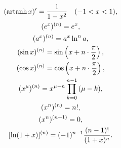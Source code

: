 \begin{gather*}
	(\operatorname{artanh} x)' = \frac{1}{1 - x^2} \quad (-1 < x < 1), \\
	(e^x)^{(n)} = e^x, \\
	(a^x)^{(n)} = a^x \ln^n a, \\
	(\sin x)^{(n)} = \sin \left( x + n \cdot \frac{\pi}{2} \right), \\
	(\cos x)^{(n)} = \cos \left( x + n \cdot \frac{\pi}{2} \right), \\
	(x^\mu)^{(n)} = x^{\mu-n}\prod_{k=0}^{n-1} {(\mu - k)}, \\
	(x^n)^{(n)} = n!, \\
	(x^n)^{(n+1)} = 0, \\
	[\ln(1+x)]^{(n)} = (-1)^{n-1} \frac{(n-1)!}{(1+x)^n}.
\end{gather*}
